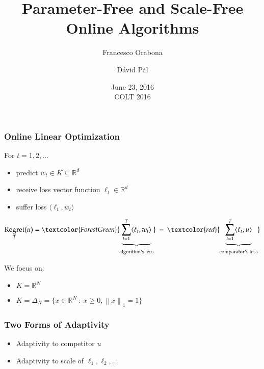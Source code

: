 \documentclass[usenames,dvipsnames]{beamer}
\title{Parameter-Free and Scale-Free \\ Online Algorithms}
\date{June 23, 2016 \\ \tiny COLT 2016}
\author{Francesco Orabona \and D\'avid P\'al}
\institute{Yahoo Research NYC}
\DeclareMathOperator{\Regret}{Regret}
\newcommand{\R}{\mathbb{R}}
\newcommand{\norm}[1]{\left\|#1\right\|}
\begin{document}
\begin{frame}
\maketitle
\end{frame}

\begin{frame}
\frametitle{Online Linear Optimization}

For $t=1,2,\dots$
\begin{itemize}
\item predict $w_t \in K \subseteq \R^d$
\item receive loss vector function $\ell_t \in \R^d$
\item suffer loss $\langle \ell_t, w_t \rangle$
\end{itemize}

\vspace{0.5cm}
$$
\Regret_T(u) = \textcolor{ForestGreen}{\underbrace{\sum_{t=1}^T \langle \ell_t, w_t \rangle}_{\text{algorithm's loss}}} \ - \ \textcolor{red}{\underbrace{\sum_{t=1}^T \langle \ell_t, u \rangle}_{\text{comparator's loss}}}
$$

\vspace{0.5cm}

We focus on:
\begin{itemize}
\item $K = \R^N$
\item $K = \Delta_N = \{ x \in \R^N ~:~ x \ge 0, \norm{x}_1 = 1 \}$
\end{itemize}

\end{frame}

\begin{frame}
\frametitle{Two Forms of Adaptivity}

\begin{itemize}
\item Adaptivity to competitor $u$
\item Adaptivity to scale of $\ell_1, \ell_2, \dots$
\end{itemize}

\end{frame}
\end{document}
